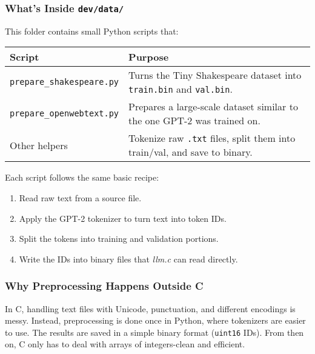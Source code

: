 \documentclass[
  letterpaper,
  DIV=11,
  numbers=noendperiod]{scrreprt}
\providecommand{\tightlist}{%
  \setlength{\itemsep}{0pt}\setlength{\parskip}{0pt}}
\begin{document}
\subsubsection{\texorpdfstring{What's Inside
\texttt{dev/data/}}{What's Inside dev/data/}}\label{whats-inside-devdata}

This folder contains small Python scripts that:

\begin{longtable}[]{@{}
  >{\raggedright\arraybackslash}p{}
  >{\raggedright\arraybackslash}p{}@{}}
\toprule\noalign{}
\begin{minipage}[b]{\linewidth}\raggedright
Script
\end{minipage} & \begin{minipage}[b]{\linewidth}\raggedright
Purpose
\end{minipage} \\
\midrule\noalign{}
\endhead
\bottomrule\noalign{}
\endlastfoot
\texttt{prepare\_shakespeare.py} & Turns the Tiny Shakespeare dataset
into \texttt{train.bin} and \texttt{val.bin}. \\
\texttt{prepare\_openwebtext.py} & Prepares a large-scale dataset
similar to the one GPT-2 was trained on. \\
Other helpers & Tokenize raw \texttt{.txt} files, split them into
train/val, and save to binary. \\
\end{longtable}

Each script follows the same basic recipe:

\begin{enumerate}
\def\labelenumi{\arabic{enumi}.}
\tightlist
\item
  Read raw text from a source file.
\item
  Apply the GPT-2 tokenizer to turn text into token IDs.
\item
  Split the tokens into training and validation portions.
\item
  Write the IDs into binary files that \emph{llm.c} can read directly.
\end{enumerate}

\subsubsection{Why Preprocessing Happens Outside
C}\label{why-preprocessing-happens-outside-c}

In C, handling text files with Unicode, punctuation, and different
encodings is messy. Instead, preprocessing is done once in Python, where
tokenizers are easier to use. The results are saved in a simple binary
format (\texttt{uint16} IDs). From then on, C only has to deal with
arrays of integers-clean and efficient.
\end{document}
